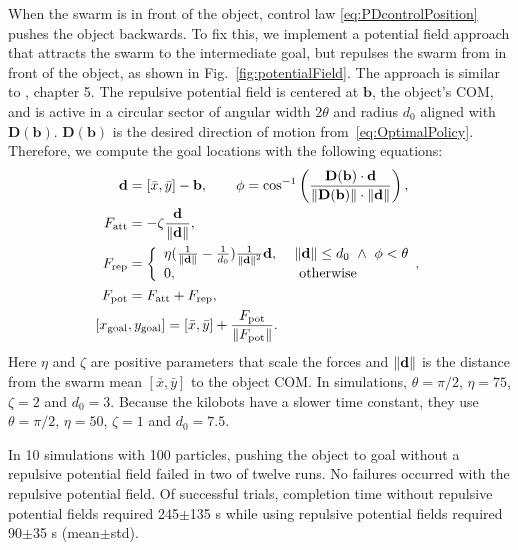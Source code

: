 When the swarm is in front of the object, control law \eqref{eq:PDcontrolPosition} pushes the object backwards.  To fix this, we implement a potential field approach that attracts the swarm to the intermediate goal, but repulses the swarm from in front of the object, as shown in Fig.~\ref{fig:potentialField}. The approach is similar to \cite{spong2008robot}, chapter 5.
The repulsive potential field is centered at $\mathbf{b}$, the object's COM, and is active in a circular sector of angular width 2$\theta$ and radius $d_0$ aligned with $\mathbf{D}(\mathbf{b})$. $\mathbf{D}(\mathbf{b})$ is the desired direction of motion from~\eqref{eq:OptimalPolicy}. Therefore, we compute the goal locations with the following equations:
\begin{align}
\mathbf{d} &=  [\bar{x},\bar{y}] - \mathbf{b}, \qquad   \phi =\cos^{-1}\left( \frac{ \mathbf{D}(\mathbf{b}) \cdot  \mathbf{d}  }{\left\lVert\mathbf{D}(\mathbf{b})\right\rVert \cdot \left\lVert\mathbf{d}\right\rVert } \right), \nonumber \\ 
F_{\rm{att}} &= -\zeta \frac{\mathbf{d}  }{ \left\lVert\mathbf{d}\right\rVert}, \nonumber\\
 F_{\rm{rep}} &=  \left\{
\begin{array}{ll}
      \eta( \frac{1}{\left\lVert\mathbf{d}\right\rVert}- \frac{1}{d_0}) \frac{1}{\left\lVert\mathbf{d}\right\rVert^2} \mathbf{d}, ~& \left\lVert\mathbf{d}\right\rVert \leq d_0~\wedge~\phi <  \theta \\
      0, & \textrm{ otherwise} \nonumber \\
\end{array},
\right.\\
F_{\rm{pot}} &= F_{\rm{att}} + F_{\rm{rep}} \label{eq:potentialfield}, \nonumber\\
[x_{\rm{goal}}&, y_{\rm{goal}}] =  [\bar{x},\bar{y}]  + \frac{F_{\rm{pot}}}{\left\lVert F_{\rm{pot}}\right\rVert}.
\end{align}
Here  $\eta$ and $\zeta$ are positive parameters that scale the forces and $\left\lVert\mathbf{d}\right\rVert$ is the distance from the swarm mean $ [\bar{x},\bar{y}]$ to the object COM.
In simulations, $\theta =  \pi/2$,  $\eta  = 75$, $\zeta = 2$ and $d_0 = 3$. Because the kilobots have a slower time constant, they use $\theta =  \pi/2$,  $\eta  = 50$, $\zeta = 1$ and $d_0 = 7.5$. 

In 10 simulations with 100 particles, pushing the object to goal without a repulsive potential field failed in two of twelve runs. No failures occurred with the repulsive potential field.  Of successful trials, completion time without repulsive potential fields required 245$\pm$135 s while using repulsive potential fields required 90$\pm$35 s (mean$\pm$std).

